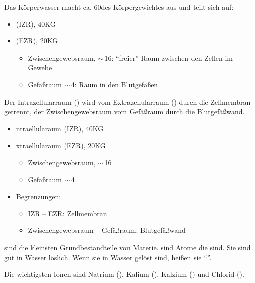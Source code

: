 {%
Das Körperwasser macht ca. 60\PC* des Körpergewichtes
aus und teilt sich auf:
\begin{itemize}
  \item {} (IZR), 40\PC* KG
  \item {} (EZR), 20\PC* KG
  \begin{itemize}
    \item {}Zwischengewebsraum,
    $\sim$\,16\PC*: \enquote{freier}
    Raum zwischen den Zellen im Gewebe
    \item {}Gefäßraum $\sim$\,4\PC*:
    Raum in den Blutgefäßen
  \end{itemize}
\end{itemize}
Der
Intrazellularraum () wird vom Extrazellularraum
() durch die Zellmembran getrennt, der
Zwischengewebsraum vom Gefäßraum durch die Blutgefäßwand.
}{%
\begin{itemize}
  \item {}ntraellularaum (IZR), 40\PC* KG
  \item {}xtraellularaum (EZR), 20\PC* KG
  \begin{itemize}
    \item Zwischengewebsraum,
    $\sim$\,16\PC*
    \item Gefäßraum $\sim$\,4\PC*
  \end{itemize}
  \item Begrenzungen:
  \begin{itemize}
    \item IZR -- EZR:    Zellmembran 
    \item Zwischengewebsraum -- Gefäßraum:  Blutgefäßwand
  \end{itemize}
\end{itemize}
}{}{}{}



{%
%
%
%
\label{topic:atome}%
\label{topic:ionen}%
\label{topic:elektrolyte}%
% 
% 
 sind die kleinsten Grundbestandteile von Materie.
 sind Atome die  sind. Sie
sind gut in Wasser löslich. Wenn sie in Wasser gelöst sind,
heißen sie \enquote{}.

Die wichtigsten Ionen sind Natrium (), Kalium
(), Kalzium () und
Chlorid ().
}{

}
{}
{}
{}

